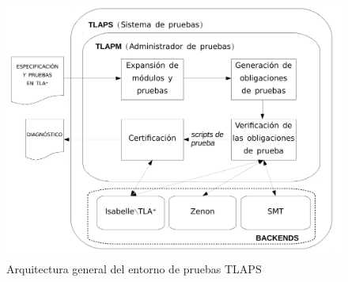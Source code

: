 \documentclass[spanish]{llncs}
\begin{document}
\begin{figure}
  \includegraphics[scale=0.4]{esquema-informe-ingsoft2}
  \caption{Arquitectura general del entorno de pruebas TLAPS}
\end{figure}
\end{document}
